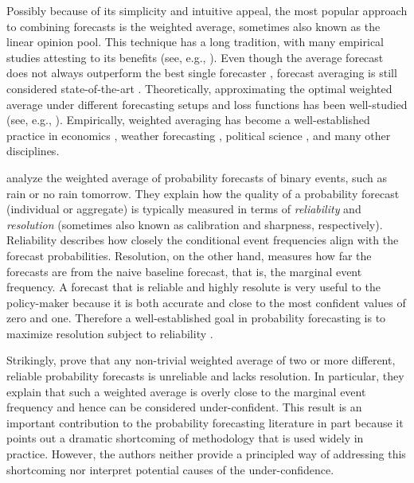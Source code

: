 \documentclass[11pt]{article}
\theoremstyle{definition}
\theoremstyle{definition}
\begin{document}
Possibly because of its simplicity and intuitive appeal, the most
popular approach to combining forecasts is the weighted average, sometimes also known as the linear opinion pool. 
This technique has a long tradition, with many empirical studies attesting to its benefits (see, e.g., \citealt{bates1969combination, clemen1989combining, armstrong2}). 
Even though the average forecast does not always outperform the best single forecaster \citep{hibon2005combine},
forecast averaging is still considered state-of-the-art \citep{elliott2013handbook}. Theoretically,  approximating the optimal weighted average under different forecasting setups and loss functions has been well-studied (see, e.g., \citealt{juditsky2008learning, degroot1991optimal}). Empirically, weighted averaging has become a well-established practice in economics \citep{blix2001good},  weather forecasting \citep{raftery2005using}, political science \citep{graefea2014combining}, and many other disciplines.
%


\cite{Ranjan08} analyze the weighted average of probability forecasts of binary events, such as rain or no
rain tomorrow. They explain how the quality of a probability forecast
(individual or aggregate) is typically measured in terms of
\textit{reliability} and \textit{resolution} (sometimes also known as calibration and
sharpness, respectively). Reliability describes how closely the
conditional event frequencies align with the forecast
probabilities. Resolution, on the other hand, measures how far the
forecasts are from the naive baseline forecast, that is, the marginal
event frequency. A forecast that is reliable and highly resolute is
very useful to the policy-maker because it is both accurate and close
to the most confident values of zero and one. Therefore a
well-established goal in probability forecasting is to maximize resolution subject to
reliability \citep{murphy1987general, gneiting2007probabilistic}.


Strikingly, \cite{Ranjan08} prove that any non-trivial weighted average
of two or more different, reliable probability forecasts is
unreliable and lacks resolution. In particular, they explain that such
a weighted average is overly
close to the marginal event frequency and hence can be considered under-confident.  This result is an important
contribution to the probability forecasting literature in part
because it points out a dramatic shortcoming of methodology that is
used widely in practice. However, the authors neither provide a
principled way of addressing this shortcoming nor interpret potential causes of the under-confidence. 
\end{document}
